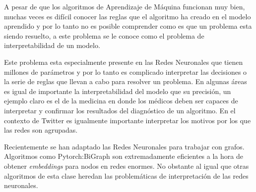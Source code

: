 A pesar de que los algoritmos de Aprendizaje de Máquina funcionan muy bien, muchas veces es difícil conocer las reglas que el algoritmo ha creado en el modelo aprendido y por lo tanto no es posible comprender como es que un problema esta siendo resuelto, a este problema se le conoce como el problema de interpretabilidad de un modelo. \cite{zhang_survey_2021} \cite{rebala_introduction_2019} 

Este problema esta especialmente presente en las Redes Neuronales que tienen millones de parámetros y por lo tanto es complicado interpretar las decisiones o la serie de reglas que llevan a cabo para resolver un problema. En algunas áreas es igual de importante la interpretabilidad del modelo que su precisión, un ejemplo claro es el de la medicina en donde los médicos deben ser capaces de interpretar y confirmar los resultados del diagnóstico de un algoritmo. En el contexto de Twitter es igualmente importante interpretar los motivos por los que las redes son agrupadas.

Recientemente se han adaptado las Redes Neuronales para trabajar con grafos. Algoritmos como Pytorch:BiGraph \cite{lerer_pytorch-biggraph_2019} son extremadamente eficientes a la hora de obtener \textit{embeddings} para nodos en redes enormes. No obstante al igual que otras algoritmos de esta clase heredan las problemáticas de interpretación de las redes neuronales.

